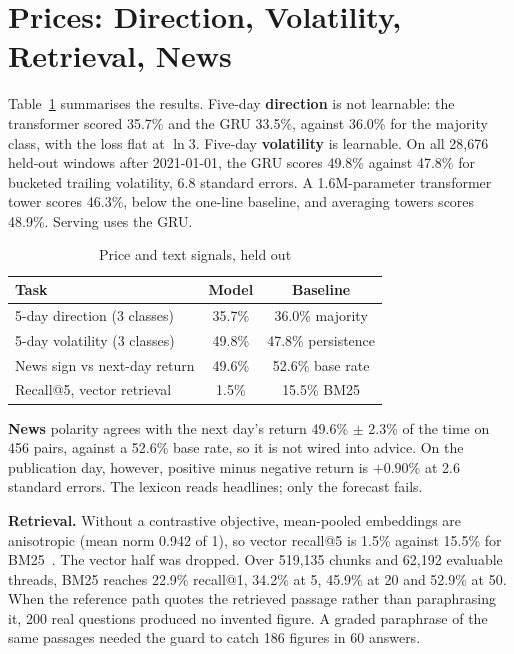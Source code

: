 \documentclass[conference]{IEEEtran}
\begin{document}
\section{Prices: Direction, Volatility, Retrieval, News}
\label{sec:prices}
Table~\ref{tab:price} summarises the results. Five-day \textbf{direction} is not learnable: the
transformer scored 35.7\% and the GRU 33.5\%, against 36.0\% for the majority class, with the loss
flat at $\ln 3$. Five-day \textbf{volatility} is learnable. On all 28{,}676 held-out windows after
2021-01-01, the GRU scores 49.8\% against 47.8\% for bucketed trailing volatility, 6.8 standard errors.
A 1.6M-parameter transformer tower scores 46.3\%, below the one-line baseline, and averaging towers
scores 48.9\%. Serving uses the GRU.

\begin{table}[t]
\centering
\caption{Price and text signals, held out}
\label{tab:price}
\begin{tabular}{@{}lcc@{}}
\toprule
Task & Model & Baseline \\
\midrule
5-day direction (3 classes) & 35.7\% & 36.0\% majority \\
5-day volatility (3 classes) & 49.8\% & 47.8\% persistence \\
News sign vs next-day return & 49.6\% & 52.6\% base rate \\
Recall@5, vector retrieval & 1.5\% & 15.5\% BM25 \\
\bottomrule
\end{tabular}
\end{table}

\textbf{News} polarity agrees with the next day's return 49.6\% $\pm$ 2.3\% of the time on 456 pairs,
against a 52.6\% base rate, so it is not wired into advice. On the publication day, however, positive
minus negative return is $+0.90\%$ at 2.6 standard errors. The lexicon reads headlines; only the
forecast fails.

\textbf{Retrieval.} Without a contrastive objective, mean-pooled embeddings are anisotropic (mean norm
0.942 of 1), so vector recall@5 is 1.5\% against 15.5\% for BM25~\cite{Robertson_2009}. The vector half
was dropped. Over 519{,}135 chunks and 62{,}192 evaluable threads, BM25 reaches 22.9\% recall@1,
34.2\% at 5, 45.9\% at 20 and 52.9\% at 50. When the reference path quotes the retrieved passage rather
than paraphrasing it, 200 real questions produced no invented figure. A graded paraphrase of the same
passages needed the guard to catch 186 figures in 60 answers.
\end{document}
